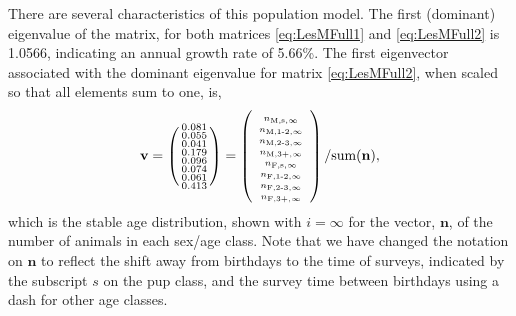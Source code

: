 \documentclass[]{risa}\usepackage[]{graphicx}\usepackage[]{color}
\newcommand{\bn}{\ensuremath{{\boldsymbol{\eta}}}}
\def\bn{\mathbf{n}}
\def\bv{\mathbf{v}}
\begin{document}
There are several characteristics of this population model.  The first (dominant) eigenvalue of the matrix, for both matrices \ref{eq:LesMFull1} and \ref{eq:LesMFull2} is 1.0566, indicating an annual growth rate of 5.66\%. The first eigenvector associated with the dominant eigenvalue for matrix \ref{eq:LesMFull2}, when scaled so that all elements sum to one, is,
\begin{equation}\label{eq:evFull2}
  \bv =  \left( \begin{smallmatrix}
 0.081 \\ 
  0.055 \\ 
  0.041 \\ 
  0.179 \\ 
  0.096 \\ 
  0.074 \\ 
  0.061 \\ 
  0.413 \\
  \end{smallmatrix} \right) =
    \left( \mbox{\scriptsize$\begin{array}{c}
    n_{\textrm{M,s},\infty} \\
    n_{\textrm{M,1-2},\infty} \\
    n_{\textrm{M,2-3},\infty} \\
    n_{\textrm{M,3+},\infty} \\
    n_{\textrm{F,s},\infty} \\
    n_{\textrm{F,1-2},\infty} \\
    n_{\textrm{F,2-3},\infty} \\
    n_{\textrm{F,3+},\infty} \\
  \end{array} $} \right)/\textrm{sum}(\bn),
\end{equation}
which is the stable age distribution, shown with $i = \infty$ for the vector, $\bn$, of the number of animals in each sex/age class.  Note that we have changed the notation on $\bn$ to reflect the shift away from birthdays to the time of surveys, indicated by the subscript $s$ on the pup class, and the survey time between birthdays using a dash for other age classes.
\end{document}
